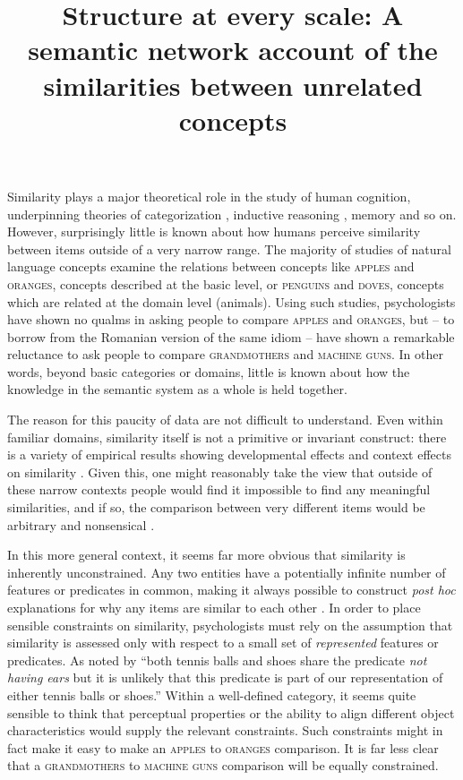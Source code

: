 \documentclass[doc]{apa6}
\title{Structure at every scale: A semantic network account of the similarities between unrelated concepts}
\newcommand{\stimulus}[1]{\textsc{#1}}
\begin{document}
\maketitle
Similarity plays a major theoretical role in the study of human cognition, underpinning theories of categorization \parencite{Goldstone1994,Hampton1998,MedinRips2005}, inductive reasoning \parencite{Osherson1990}, memory \parencite{Rips1973} and so on. However, surprisingly little is known about how humans perceive similarity between items outside of a very narrow range.
The majority of studies of natural language concepts examine the relations between concepts like \stimulus{apples} and \stimulus{oranges}, concepts described at the basic level, or \stimulus{penguins} and \stimulus{doves}, concepts which are related at the domain level (animals).
Using such studies, psychologists have shown no qualms in asking people to compare \stimulus{apples} and \stimulus{oranges}, but -- to borrow from the Romanian version of the same idiom -- have shown a remarkable reluctance to ask people to compare \stimulus{grandmothers} and \stimulus{machine guns}. In other words, beyond basic categories or domains, little is known about how the knowledge in the semantic system as a whole is held together.

The reason for this paucity of data are not difficult to understand. Even within familiar domains, similarity itself is not a primitive or invariant construct: there is a variety of empirical results showing developmental effects and context effects on similarity \parencite{EstesGolonka2011,Medin1993,MedinRips2005}. Given this, one might reasonably take the view that outside of these narrow contexts people would find it impossible to find any meaningful similarities, and if so, the comparison between very different items would be arbitrary and nonsensical \parencite{Fillenbaum1971}.

In this more general context, it seems far more obvious that similarity is inherently unconstrained. Any two entities have a potentially infinite number of features or predicates in common, making it always possible to construct {\it post hoc} explanations for why any items are similar to each other \parencite{Goodman1972,Medin1993}. In order to place sensible constraints on similarity, psychologists must rely on the assumption that similarity is assessed only with respect to a small set of {\it represented} features or predicates. As noted by \textcite[p.180]{Medin1989} ``both tennis balls and shoes share the predicate {\it not having ears} but it is unlikely that this predicate is part of our representation of either tennis balls or shoes.'' Within a well-defined category, it seems quite sensible to think that perceptual properties \parencite{Goldstone1994} or the ability to align different object characteristics \parencite{Markman1993} would supply the relevant constraints. Such constraints might in fact make it easy to make an \stimulus{apples} to \stimulus{oranges} comparison. It is far less clear that a \stimulus{grandmothers} to \stimulus{machine guns} comparison will be equally constrained.
\end{document}
